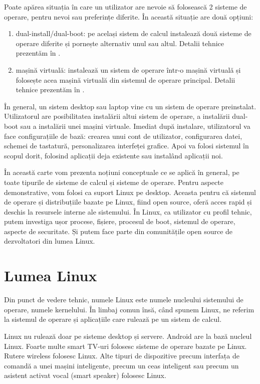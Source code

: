 Poate apărea situația în care un utilizator are nevoie să folosească 2 sisteme de operare, pentru nevoi sau preferințe diferite. În această situație are două opțiuni:

\begin{enumerate}
  \item dual-install/dual-boot: pe același sistem de calcul instalează două sisteme de operare diferite și pornește alternativ unul sau altul. Detalii tehnice prezentăm în .
  \item mașină virtuală: instalează un sistem de operare într-o mașină virtuală și folosește acea mașină virtuală din sistemul de operare principal. Detalii tehnice prezentăm în .
\end{enumerate}

În general, un sistem desktop sau laptop vine cu un sistem de operare preinstalat. Utilizatorul are posibilitatea instalării altui sistem de operare, a instalării dual-boot sau a instalării unei mașini virtuale. Imediat după instalare, utilizatorul va face configurațiile de bază: crearea unui cont de utilizator, configurarea datei, schemei de tastatură, personalizarea interfeței grafice. Apoi va folosi sistemul în scopul dorit, folosind aplicații deja existente sau instalând aplicații noi.

În această carte vom prezenta noțiuni conceptuale ce se aplică în general, pe toate tipurile de sisteme de calcul și sisteme de operare. Pentru aspecte demonstrative, vom folosi ca suport Linux pe desktop. Aceasta pentru că sistemul de operare și distribuțiile bazate pe Linux, fiind open source, oferă acces rapid și deschis la resursele interne ale sistemului. În Linux, ca utilizator cu profil tehnic, putem investiga ușor procese, fișiere, procesul de boot, sistemul de operare, aspecte de securitate. Și putem face parte din comunitățile open source de dezvoltatori din lumea Linux.

\section{Lumea Linux}
\label{sec:intro:linux}

Din punct de vedere tehnic, numele Linux este numele nucleului sistemului de operare, numele kernelului. În limbaj comun însă, când spunem Linux, ne referim la sistemul de operare și aplicațiile care rulează pe un sistem de calcul.

Linux nu rulează doar pe sisteme desktop și servere. Android are la bază nucleul Linux. Foarte multe smart TV-uri folosesc sisteme de operare bazate pe Linux. Rutere wireless folosesc Linux. Alte tipuri de dispozitive precum interfața de comandă a unei mașini inteligente, precum un ceas inteligent sau precum un asistent activat vocal (smart speaker) folosesc Linux.

